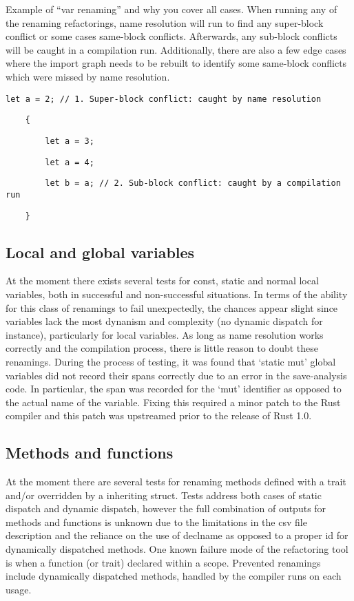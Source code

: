 Example of “var renaming” and why you cover all cases. When running any of the renaming refactorings, name resolution will run to find any super-block conflict or some cases same-block conflicts. Afterwards, any sub-block conflicts will be caught in a compilation run. Additionally, there are also a few edge cases where the import graph needs to be rebuilt to identify some same-block conflicts which were missed by name resolution.
\begin{fig}
{\verb|let a = 2; // 1. Super-block conflict: caught by name resolution|}

{\verb|    {|}

{\verb|        let |}{\color{red}\verb|a|}{\verb| = 3;|}

{\verb|        let a = 4;|}

{\verb|        let b = |}{\color{red}\verb|a|}{\verb|; // 2. Sub-block conflict: caught by a compilation run|}

{\verb|    }|}
\caption{Examining a tentative rename in red}
\label{Fig:walk}
\end{fig}

\subsection{Local and global variables}
At the moment there exists several tests for const, static and normal local variables, both in successful and non-successful situations. In terms of the ability for this class of renamings to fail unexpectedly, the chances appear slight since variables lack the most dynanism and complexity (no dynamic dispatch for instance), particularly for local variables. As long as name resolution works correctly and the compilation process, there is little reason to doubt these renamings. During the process of testing, it was found that `static mut' global variables did not record their spans correctly due to an error in the save-analysis code. In particular, the span was recorded for the `mut' identifier as opposed to the actual name of the variable. Fixing this required a minor patch to the Rust compiler and this patch was upstreamed prior to the release of Rust 1.0.


\subsection{Methods and functions}
At the moment there are several tests for renaming methods defined with a trait and/or overridden by a inheriting struct. Tests address both cases of static dispatch and dynamic dispatch, however the full combination of outputs for methods and functions is unknown due to the limitations in the csv file description and the reliance on the use of declname as opposed to a proper id for dynamically dispatched methods. One known failure mode of the refactoring tool is when a function (or trait) declared within a scope. Prevented renamings include dynamically dispatched methods, handled by the compiler runs on each usage.

